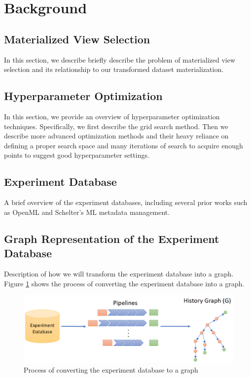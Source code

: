 \section{Background} \label{sec-background}
\subsection{Materialized View Selection}
In this section, we describe briefly describe the problem of materialized view selection and its relationship to our transformed dataset materialization.
\subsection{Hyperparameter Optimization}\label{background-hyperparameter-optimization}
In this section, we provide an overview of hyperparameter optimization techniques. 
Specifically, we first describe the grid search method.
Then we describe more advanced optimization methods and their heavy reliance on defining a proper search space and many iterations of search to acquire enough points to suggest good hyperparameter settings.

\subsection{Experiment Database}
A brief overview of the experiment databases, including several prior works such as OpenML and Schelter's  ML metadata management.

\subsection{Graph Representation of the Experiment Database}
Description of how we will transform the experiment database into a graph.
Figure \ref{fig-graph-creation} shows the process of converting the experiment database into a graph.

\begin{figure}
\centering
\includegraphics[width=\columnwidth]{../images/graph-creation.png}
\caption{Process of converting the experiment database to a graph}
\label{fig-graph-creation}
\end{figure}
